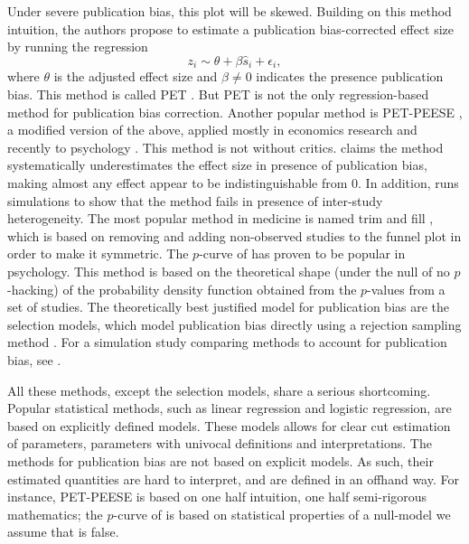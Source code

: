Under severe publication bias, this plot will be skewed. Building on this method intuition, the authors propose to estimate a publication bias-corrected effect size by running the regression
\[
z_{i}\sim\theta+\beta\widehat{s}_{i}+\epsilon_{i},
\]
where $\theta$ is the adjusted effect size and $\beta\neq0$ indicates the presence publication bias. This method is called PET . But PET is not the only regression-based method for publication bias
correction. Another popular method is PET-PEESE , a modified version of the above, applied mostly in economics research and recently to psychology . This method is not without critics. \textcite{gervais_putting_2015} claims the method systematically underestimates the effect size in presence of publication bias, making almost any effect appear to be indistinguishable from $0$. In addition, \textcite{simonsohn_[59]_2017} runs simulations to show that the method fails in presence of inter-study heterogeneity. The most popular method in medicine is named trim and fill , which is based on removing and adding non-observed studies to the funnel plot in order to make it symmetric. The $p$-curve of \textcite{simonsohn_p-curve:_2014} has proven to be popular in psychology. This method is based on the theoretical shape (under the null of no $p$-hacking) of the probability density function obtained from the $p$-values from a set of studies.
The theoretically best justified model for publication bias are the selection models, which model publication bias directly using a rejection sampling method \textcite{Hedges1992-ue}. For a simulation study comparing methods to account for publication bias, see \textcite{moreno_assessment_2009,Carter2019-rw}.

All these methods, except the selection models, share a serious shortcoming. Popular statistical methods, such as linear regression and logistic regression, are based on explicitly defined models. These models allows for clear cut estimation of parameters, parameters with univocal definitions and interpretations. The methods for publication bias are not based on explicit models. As such, their estimated quantities are hard to interpret, and are defined in an offhand way. For instance, PET-PEESE is based on one half intuition, one half semi-rigorous mathematics; the $p$-curve of is based on statistical properties of a null-model we assume that is false. 

